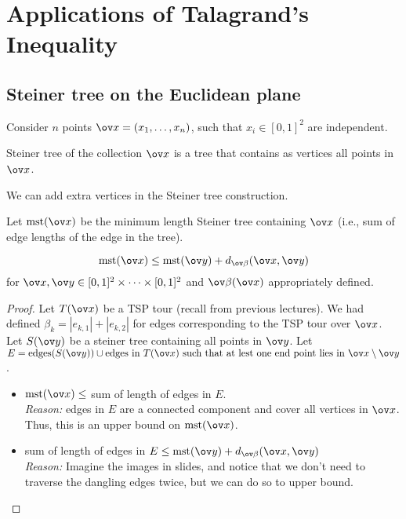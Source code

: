 \chapter{Applications of Talagrand's Inequality}
\section{Steiner tree on the Euclidean plane}
Consider $n$ points $\ov x = (x_1, \dots, x_n)$, such that $x_i \in [0,1]^2$ are independent. 
\begin{definition}
Steiner tree of the collection $\ov x$ is a tree that contains as vertices all points in $\ov x$.
\end{definition}
\begin{note}
We can add extra vertices in the Steiner tree construction.
\end{note}
\newcommand{\mst}{\text{mst}}
Let $\text{mst}(\ov x)$ be the minimum length Steiner tree containing $\ov x$ (i.e., sum of edge lengths of the edge in the tree).
\begin{prop}
\[
\mst(\ov x) \leq \mst(\ov y) + d_{\ov\beta}(\ov x, \ov y)
\]
for $\ov x, \ov y \in [0,1]^2 \times \dots \times [0,1]^2$ and $\ov\beta (\ov x)$ appropriately defined.
\end{prop}
\begin{proof}
Let $T(\ov x)$ be a TSP tour (recall from previous lectures). We had defined $\beta_k = |e_{k,1}| + |e_{k,2}|$ for edges corresponding to the TSP tour over $\ov x$. 
Let $S(\ov y)$ be a steiner tree containing all points in $\ov y$. Let $E = \text{edges}(S(\ov y)) \cup \text{edges in $T(\ov x)$ such that at lest one end point lies in $\ov x\setminus \ov y$}$.
\begin{itemize}
    \item[\circled{1}] $\mst(\ov x) \leq $ sum of length of edges in $E$. \\
    \textit{Reason:} edges in $E$ are a connected component and cover all vertices in $\ov x$. Thus, this is an upper bound on $\mst(\ov x)$.
    \item[\circled{2}] sum of length of edges in $E \leq \mst(\ov y) + d_{\ov\beta}(\ov x, \ov y)$\\
    \textit{Reason:} Imagine the images in slides, and notice that we don't need to traverse the dangling edges twice, but we can do so to upper bound.
\end{itemize}
\end{proof}

